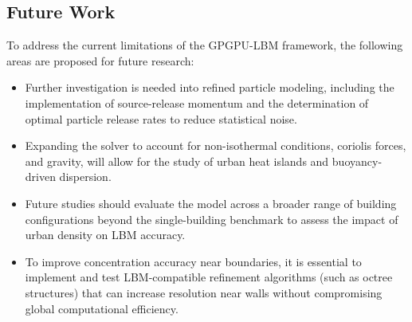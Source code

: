 \subsection{Future Work}
To address the current limitations of the GPGPU-LBM framework, the following areas are proposed for future research:
\begin{itemize}
    \item Further investigation is needed into refined particle modeling, including the implementation of source-release momentum and the determination of optimal particle release rates to reduce statistical noise.
    \item Expanding the solver to account for non-isothermal conditions, coriolis forces, and gravity, will allow for the study of urban heat islands and buoyancy-driven dispersion.
    \item Future studies should evaluate the model across a broader range of building configurations beyond the single-building benchmark to assess the impact of urban density on LBM accuracy.
    \item To improve concentration accuracy near boundaries, it is essential to implement and test LBM-compatible refinement algorithms (such as octree structures) that can increase resolution near walls without compromising global computational efficiency.
\end{itemize}


\newpage